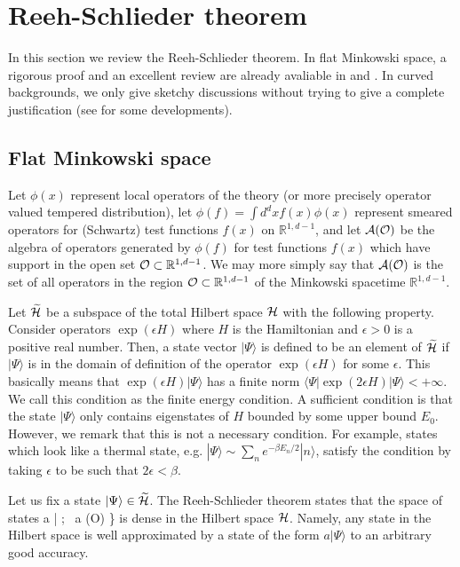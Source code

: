 \documentclass[a4paper,11pt]{article}
\theoremstyle{plain}
\theoremstyle{definition}
\numberwithin{thm}{section}
\newcommand{\bra}[1]{ \langle {#1} | }
\newcommand{\ket}[1]{ | {#1} \rangle }
\def\CA{{\cal A}}
\def\CH{{\cal H}}
\def\CO{{\cal O}}
\def\BR{{\mathbb R}}
\def\beq#1\eeq{\begin{align}#1\end{align}}
\begin{document}
\section{Reeh-Schlieder theorem }\label{sec:RS}
In this section we review the Reeh-Schlieder theorem.
In flat Minkowski space, a rigorous proof and an excellent review are already avaliable in \cite{Streater:1989vi} and \cite{Witten:2018zxz}.
In curved backgrounds, we only give sketchy discussions without trying to give a complete justification (see \cite{Strohmaier:2002mm,Gerard:2017apb,Sanders:2008gs, Morrison:2014jha} for some developments). 


\subsection{Flat Minkowski space}
Let $\phi(x)$ represent local operators of the theory (or more precisely operator valued tempered distribution),
let $\phi(f)=\int d^d x f(x) \phi(x)$ represent smeared operators for (Schwartz) test functions $f(x)$ on $\BR^{1,d-1}$,
and let $\CA(\CO)$ be the algebra of operators generated by $\phi(f)$ for test functions $f(x)$ which have support in 
the open set $\CO \subset \BR^{1,d-1}$. 
We may more simply say that $\CA(\CO)$ is the set of all operators in the region $\CO \subset \BR^{1,d-1}$ of the Minkowski spacetime $\BR^{1,d-1}$.

Let $\widetilde{\CH}$ be a subspace of the total Hilbert space $\CH$ with the following property.
Consider operators $\exp ( \epsilon H )$ where $H$ is the Hamiltonian and $\epsilon >0$ is a positive real number.
Then, a state vector $\ket{\Psi} $ is defined to be an element of $\widetilde{\CH}$ if $\ket{\Psi}$ is in the domain of definition
of the operator $\exp ( \epsilon H )$ for some $\epsilon$. This basically means that $\exp ( \epsilon H )\ket{\Psi}$ has a finite norm
$\bra{\Psi} \exp(2\epsilon H) \ket{\Psi} < + \infty$. We call this condition as the finite energy condition. 
A sufficient condition is that the state $\ket{\Psi}$ only contains eigenstates of $H$ bounded by some upper bound $E_0$.
However, we remark that this is not a necessary condition. For example, states which look like a thermal state, e.g. $\ket{\Psi} \sim \sum_n e^{-\beta E_n/2} \ket{n}$,
satisfy the condition by taking $\epsilon$ to be such that $2\epsilon < \beta$.

Let us fix a state $\ket{\Psi} \in \widetilde{\CH}$.
The Reeh-Schlieder theorem states that the space of states
\beq
\{ a \ket{\Psi}  ;~ a \in \CA(\CO) \}
\eeq
is dense in the Hilbert space $\CH$. Namely, any state in the Hilbert space is well approximated by a state of the form $a \ket{\Psi}$ to an arbitrary good accuracy. 
\end{document}
